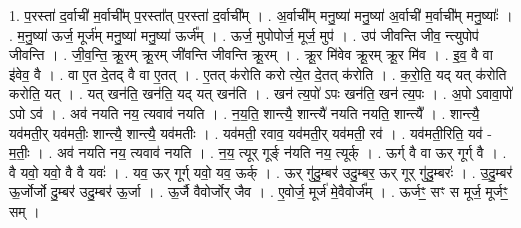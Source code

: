 \documentclass[17pt]{extarticle}
\begin{document}
1. प॒रस्ता॑ द॒र्वाची॑ म॒र्वाची᳚म् प॒रस्ता᳚त् प॒रस्ता॑ द॒र्वाची᳚म् । . अ॒र्वाची᳚म् मनु॒ष्या॑ मनु॒ष्या॑ अ॒र्वाची॑ म॒र्वाची᳚म् मनु॒ष्याः᳚ । . म॒नु॒ष्या॑ ऊर्ज॒ मूर्ज॑म् मनु॒ष्या॑ मनु॒ष्या॑ ऊर्ज᳚म् । . ऊर्ज॒ मुपोपोर्ज॒ मूर्ज॒ मुप॑ । . उप॑ जीवन्ति जीव॒ न्त्युपोप॑ जीवन्ति । . जी॒व॒न्ति॒ क्रू॒रम् क्रू॒रम् जी॑वन्ति जीवन्ति क्रू॒रम् । . क्रू॒र मि॑वेव क्रू॒रम् क्रू॒र मि॑व । . इ॒व॒ वै वा इ॑वेव॒ वै । . वा ए॒त दे॒तद् वै वा ए॒तत् । . ए॒तत् क॑रोति करो त्ये॒त दे॒तत् क॑रोति । . क॒रो॒ति॒ यद् यत् क॑रोति करोति॒ यत् । . यत् खन॑ति॒ खन॑ति॒ यद् यत् खन॑ति । . खन॑ त्य॒पो॑ ऽपः खन॑ति॒ खन॑ त्य॒पः । . अ॒पो ऽवावा॒पो॑ ऽपो ऽव॑ । . अव॑ नयति नय॒ त्यवाव॑ नयति । . न॒य॒ति॒ शान्त्यै॒ शान्त्यै॑ नयति नयति॒ शान्त्यै᳚ । . शान्त्यै॒ यव॑मती॒र् यव॑मतीः॒ शान्त्यै॒ शान्त्यै॒ यव॑मतीः । . यव॑मती॒ रवाव॒ यव॑मती॒र् यव॑मती॒ रव॑ । . यव॑मती॒रिति॒ यव॑ - म॒तीः॒ । . अव॑ नयति नय॒ त्यवाव॑ नयति । . न॒य॒ त्यूर् गूर्ङ् न॑यति नय॒ त्यूर्क् । . ऊर्ग् वै वा ऊर् गूर्ग् वै । . वै यवो॒ यवो॒ वै वै यवः॑ । . यव॒ ऊर् गूर्ग् यवो॒ यव॒ ऊर्क् । . ऊर् गु॑दु॒म्बर॑ उदु॒म्बर॒ ऊर् गूर् गु॑दु॒म्बरः॑ । . उ॒दु॒म्बर॑ ऊ॒र्जोर्जो दु॒म्बर॑ उदु॒म्बर॑ ऊ॒र्जा । . ऊ॒र्जै वैवोर्जोर् जैव । . ए॒वोर्ज॒ मूर्ज॑ मे॒वैवोर्ज᳚म् । . ऊर्जꣳ॒॒ सꣳ स मूर्ज॒ मूर्जꣳ॒॒ सम् । \newline
\end{document}
